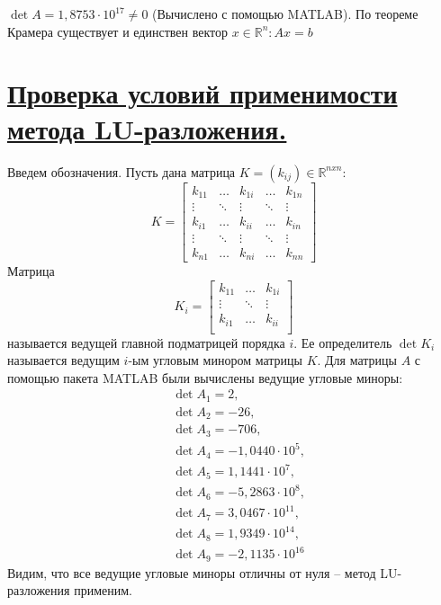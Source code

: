 \documentclass[a4paper, 12pt]{article}
\begin{document}
	$\det A = 1,8753\cdot 10^{17} \neq 0$ (Вычислено с помощью MATLAB). По теореме Крамера существует и единствен вектор $x\in\mathbb{R}^n:Ax=b$
	
	\section{\underline{Проверка условий применимости метода LU-разложения.}}
	
	Введем обозначения. Пусть дана матрица $K=(k_{ij})\in\mathbb{R}^{nxn}$:
	\begin{equation*}
		K=
		\begin{bmatrix}
			k_{11} & \dots & k_{1i} & \dots & k_{1n} \\
			\vdots & \ddots & \vdots & \ddots & \vdots \\
			k_{i1} & \dots & k_{ii} & \dots & k_{in} \\
			\vdots & \ddots & \vdots & \ddots & \vdots \\
			k_{n1} & \dots & k_{ni} & \dots & k_{nn}
		\end{bmatrix}
	\end{equation*}
	Матрица
	\begin{equation*}
		K_i=
		\begin{bmatrix}
			k_{11} & \dots & k_{1i} \\
			\vdots & \ddots & \vdots \\
			k_{i1} & \dots & k_{ii} \\
		\end{bmatrix}
	\end{equation*}
	называется ведущей главной подматрицей порядка $i$. Ее определитель $\det K_i$ называется ведущим $i$-ым угловым минором матрицы $K$. Для матрицы $A$ с помощью пакета MATLAB были вычислены ведущие угловые миноры:
	\begin{equation*}
		\begin{aligned}
			&\det A_1 = 2,\\
			&\det A_2 = -26,\\
			&\det A_3 = -706,\\
			&\det A_4 = -1,0440 \cdot 10^5,\\
			&\det A_5 = 1,1441 \cdot 10^7,\\
			&\det A_6 = -5,2863 \cdot 10^8, \\
			&\det A_7 = 3,0467 \cdot 10^{11}, \\
			&\det A_8 = 1,9349 \cdot 10^{14}, \\
			&\det A_9 = -2,1135 \cdot 10^{16}
		\end{aligned}
	\end{equation*}
	Видим, что все ведущие угловые миноры отличны от нуля -- метод LU-разложения применим.
	
\end{document}
